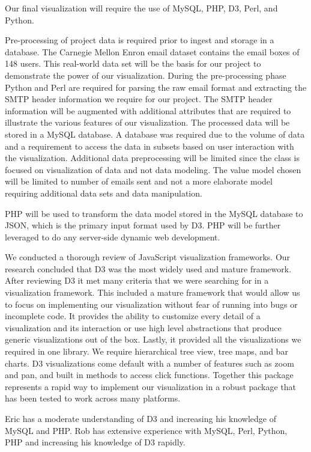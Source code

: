 \documentclass{soups}
\begin{document}
Our final visualization will require the use of MySQL, PHP, D3, Perl, and Python.

Pre-processing of project data is required prior to ingest and storage in a database.  The Carnegie Mellon Enron email dataset\cite{cmuenron} contains the email boxes of 148 users.  This real-world data set will be the basis for our project to demonstrate the power of our visualization.  During the pre-processing phase Python and Perl are required for parsing the raw email format and extracting the SMTP header information we require for our project.  The SMTP header information will be augmented with additional attributes that are required to illustrate the various features of our visualization.  The processed data will be stored in a MySQL database.  A database was required due to the volume of data and a requirement to access the data in subsets based on user interaction with the visualization.  Additional data preprocessing will be limited since the class is focused on visualization of data and not data modeling.  The value model chosen will be limited to number of emails sent and not a more elaborate model requiring additional data sets and data manipulation.   

PHP will be used to transform the data model stored in the MySQL database to JSON, which is the primary input format used by D3.  PHP will be further leveraged to do any server-side dynamic web development.

We conducted a thorough review of JavaScript visualization frameworks.  Our research concluded that D3 was the most widely used and mature framework.  After reviewing D3 it met many criteria that we were searching for in a visualization framework.  This included a mature framework that would allow us to focus on implementing our visualization without fear of running into bugs or incomplete code.  It provides the ability to customize every detail of a visualization and its interaction or use high level abstractions that produce generic visualizations out of the box.  Lastly, it provided all the visualizations we required in one library.  We require hierarchical tree view, tree maps, and bar charts.  D3 visualizations come default with a number of features such as zoom and pan, and built in methods to access click functions.  Together this package represents a rapid way to implement our visualization in a robust package that has been tested to work across many platforms.

Eric has a moderate understanding of D3 and increasing his knowledge of MySQL and PHP.  Rob has extensive experience with MySQL, Perl, Python, PHP and increasing his knowledge of D3 rapidly.
\end{document}
